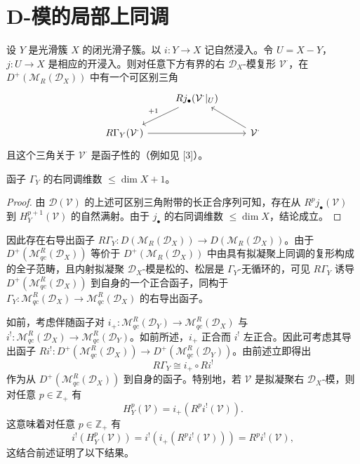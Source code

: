 \section{D-模的局部上同调}

设 $Y$ 是光滑簇 $X$ 的闭光滑子簇。以 $i:Y\to X$ 记自然浸入。令 $U=X-Y$，$j:U\to X$ 是相应的开浸入。则对任意下方有界的右 $\mathcal{D}_X$-模复形 $\mathcal{V}^\cdot$，在
$D^+(\mathcal{M}_R(\mathcal{D}_X))$ 中有一个可区别三角
$$\begin{tikzcd}
& Rj_\bullet(\mathcal{V}^\cdot|_U) \arrow[dl,"+1"'] & \\
R\Gamma_Y(\mathcal{V}^\cdot) \arrow[rr] && \mathcal{V}^\cdot \arrow[lu]
\end{tikzcd}$$
且这个三角关于 $\mathcal{V}^\cdot$ 是函子性的（例如见 [3]）。

\begin{lemma}\label{lem:4.9.1}
函子 $\Gamma_Y$ 的右同调维数 $\le\dim X+1$。
\end{lemma}

\begin{proof}
由 $\mathcal{D}(\mathcal{V})$ 的上述可区别三角附带的长正合序列可知，存在从
$R^pj_\bullet(\mathcal{V})$ 到 $H^{p+1}_Y(\mathcal{V})$ 的自然满射。由于 $j_\bullet$ 的右同调维数 $\le\dim X$，结论成立。
\end{proof}

因此存在右导出函子
$R\Gamma_Y:D(\mathcal{M}_R(\mathcal{D}_X))\to D(\mathcal{M}_R(\mathcal{D}_X))$。由于
$D^+(\mathcal{M}^R_{qc}(\mathcal{D}_X))$ 等价于 $D^+(\mathcal{M}_R(\mathcal{D}_X))$ 中由具有拟凝聚上同调的复形构成的全子范畴，且内射拟凝聚 $\mathcal{D}_X$-模是松的、松层是 $\Gamma_Y$-无循环的，可见 $R\Gamma_Y$ 诱导 $D^+(\mathcal{M}^R_{qc}(\mathcal{D}_X))$ 到自身的一个正合函子，同构于
$\Gamma_Y:\mathcal{M}^R_{qc}(\mathcal{D}_X)\to\mathcal{M}^R_{qc}(\mathcal{D}_X)$ 的右导出函子。

如前，考虑伴随函子对
$i_+:\mathcal{M}^R_{qc}(\mathcal{D}_Y)\to\mathcal{M}^R_{qc}(\mathcal{D}_X)$ 与
$i^!:\mathcal{M}^R_{qc}(\mathcal{D}_X)\to\mathcal{M}^R_{qc}(\mathcal{D}_Y)$。如前所述，$i_+$ 正合而 $i^!$ 左正合。因此可考虑其导出函子
$Ri^!:D^+(\mathcal{M}^R_{qc}(\mathcal{D}_X))\to D^+(\mathcal{M}^R_{qc}(\mathcal{D}_Y))$。由前述立即得出
$$R\Gamma_Y\cong i_+\circ Ri^!$$
作为从 $D^+(\mathcal{M}^R_{qc}(\mathcal{D}_X))$ 到自身的函子。特别地，若 $\mathcal{V}$ 是拟凝聚右 $\mathcal{D}_X$-模，则对任意 $p\in\mathbb{Z}_+$ 有
$$H_Y^p(\mathcal{V})=i_+(R^pi^!(\mathcal{V})).$$
这意味着对任意 $p\in\mathbb{Z}_+$ 有
$$i^!(H^p_Y(\mathcal{V}))=i^!(i_+(R^pi^!(\mathcal{V})))=R^pi^!(\mathcal{V}),$$
这结合前述证明了以下结果。

